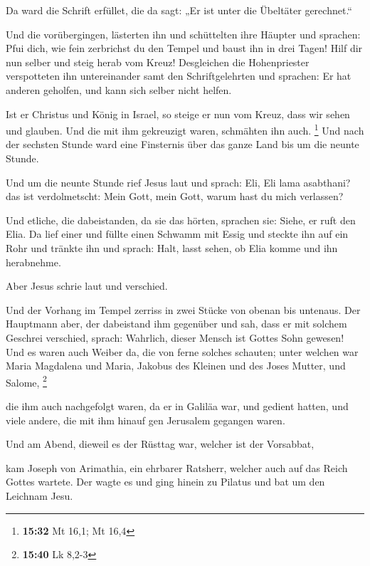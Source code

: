  Da ward die Schrift erfüllet, die da sagt: „Er ist unter
die Übeltäter gerechnet.``

 Und die vorübergingen, lästerten ihn und schüttelten ihre
Häupter und sprachen: Pfui dich, wie fein zerbrichst du den Tempel und
baust ihn in drei Tagen!  Hilf dir nun selber und steig
herab vom Kreuz!  Desgleichen die Hohenpriester
verspotteten ihn untereinander samt den Schriftgelehrten und sprachen:
Er hat anderen geholfen, und kann sich selber nicht helfen.

 Ist er Christus und König in Israel, so steige er nun vom
Kreuz, dass wir sehen und glauben. Und die mit ihm gekreuzigt waren,
schmähten ihn auch. \footnote{\textbf{15:32} Mt 16,1; Mt 16,4}
 Und nach der sechsten Stunde ward eine Finsternis über das
ganze Land bis um die neunte Stunde.

 Und um die neunte Stunde rief Jesus laut und sprach: Eli,
Eli lama asabthani? das ist verdolmetscht: Mein Gott, mein Gott, warum
hast du mich verlassen?

 Und etliche, die dabeistanden, da sie das hörten, sprachen
sie: Siehe, er ruft den Elia.  Da lief einer und füllte
einen Schwamm mit Essig und steckte ihn auf ein Rohr und tränkte ihn und
sprach: Halt, lasst sehen, ob Elia komme und ihn herabnehme.

 Aber Jesus schrie laut und verschied.

 Und der Vorhang im Tempel zerriss in zwei Stücke von
obenan bis untenaus.  Der Hauptmann aber, der dabeistand
ihm gegenüber und sah, dass er mit solchem Geschrei verschied, sprach:
Wahrlich, dieser Mensch ist Gottes Sohn gewesen!  Und es
waren auch Weiber da, die von ferne solches schauten; unter welchen war
Maria Magdalena und Maria, Jakobus des Kleinen und des Joses Mutter, und
Salome, \footnote{\textbf{15:40} Lk 8,2-3}

 die ihm auch nachgefolgt waren, da er in Galiläa war, und
gedient hatten, und viele andere, die mit ihm hinauf gen Jerusalem
gegangen waren.

 Und am Abend, dieweil es der Rüsttag war, welcher ist der
Vorsabbat,

 kam Joseph von Arimathia, ein ehrbarer Ratsherr, welcher
auch auf das Reich Gottes wartete. Der wagte es und ging hinein zu
Pilatus und bat um den Leichnam Jesu.


